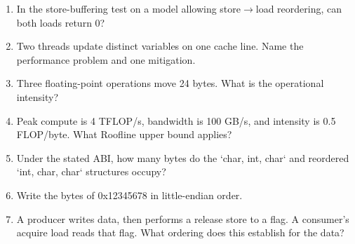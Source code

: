 \documentclass[11pt]{article}
\begin{document}
\begin{keepsection}
\begin{enumerate}
\item In the store-buffering test on a model allowing store\ensuremath{\to}load reordering, can both loads return 0?
\item Two threads update distinct variables on one cache line. Name the performance problem and one mitigation.
\item Three floating-point operations move 24 bytes. What is the operational intensity?
\item Peak compute is 4 TFLOP/s, bandwidth is 100 GB/s, and intensity is 0.5 FLOP/byte. What Roofline upper bound applies?
\item Under the stated ABI, how many bytes do the `char, int, char` and reordered `int, char, char` structures occupy?
\item Write the bytes of 0x12345678 in little-endian order.
\item A producer writes data, then performs a release store to a flag. A consumer’s acquire load reads that flag. What ordering does this establish for the data?
\end{enumerate}

\end{keepsection}
\end{document}
